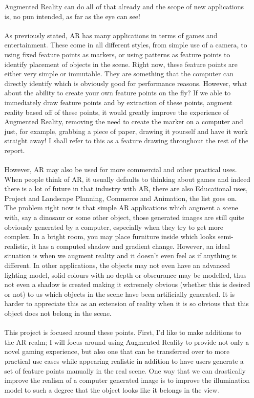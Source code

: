 \documentclass[11pt]{report}
\begin{document}
Augmented Reality can do all of that already and the scope of new
applications is, no pun intended, as far as the eye can see!    
\\ \\
As previously stated, AR has many applications in terms of games and 
entertainment. These come in all different styles, from simple use of a camera,
to using fixed feature points as markers, or using patterns as feature points
to identify placement of objects in the scene. Right now, these feature points
are either very simple or immutable. They are something that the computer
can directly identify which is obviously good for performance reasons. However,
what about the ability to create your own feature points on the fly? If we
able to immediately draw feature points and by extraction of these points, 
augment reality based off of these points, it would greatly improve the 
experience of Augmented Reality, removing the need to create the marker 
on a computer and just, for example, grabbing a piece of paper, drawing it
yourself and have it work straight away! I shall refer to this as a feature
drawing throughout the rest of the report. 
\\ \\
However, AR may also be used for more commercial and other practical uses. 
When people think of AR, it usually defaults to thinking about games and 
indeed there is a lot of future in that industry with AR, there are also
Educational uses, Project and Landscape Planning, Commerce and Animation, 
the list goes on. The problem right now is that simple AR applications which
augment a scene with, say a dinosaur or some other object, those generated
images are still quite obviously generated by a computer, especially when 
they try to get more complex. In a bright room, you may place furniture inside
which looks semi-realistic, it has a computed shadow and gradient change. 
However, an ideal situation is when we augment reality and it doesn't even
feel as if anything is different. In other applications, the objects may not
even have an advanced lighting model, solid colours with no depth or 
obscurance may be modelled, thus not even a shadow is created making it 
extremely obvious (whether this is desired or not) to us which objects in
the scene have been artificially generated. It is harder to appreciate this
as an extension of reality when it is so obvious that this object does not
belong in the scene.
\\ \\
This project is focused around these points. First, I'd like to make additions
to the AR realm; I will focus around using Augmented Reality to 
provide not only a novel gaming experience, but also one that can be 
transferred over to more practical use cases while appearing realistic in
addition to have users generate a set of feature points manually in the real scene.
One way that we can drastically improve the realism of a computer generated
image is to improve the illumination model to such a degree that the object
looks like it belongs in the view. 
\\ \\
\end{document}
